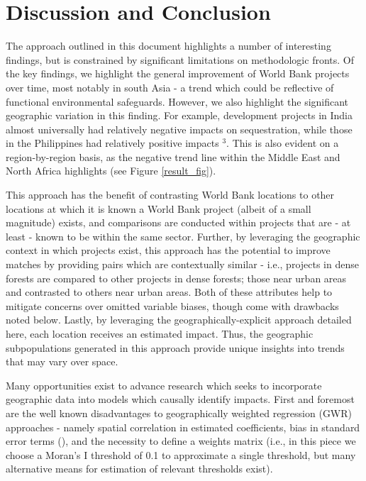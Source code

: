 \documentclass[sustainability,article,submit,moreauthors,pdftex,10pt,a4paper]{mdpi}
\begin{document}
\section{Discussion and Conclusion}
The approach outlined in this document highlights a number of interesting findings, but is constrained by significant limitations on methodologic fronts. Of the key findings, we highlight the general improvement of World Bank projects over time, most notably in south Asia - a trend which could be reflective of functional environmental safeguards. However, we also highlight the significant geographic variation in this finding.  For example, development projects in India almost universally had relatively negative impacts on sequestration, while those in the Philippines had relatively positive impacts \begin{math}^{3}\end{math}. This is also evident on a region-by-region basis, as the negative trend line within the Middle East and North Africa highlights (see Figure \ref{result_fig}).  
\par
This approach has the benefit of contrasting World Bank locations to other locations at which it is known a World Bank project (albeit of a small magnitude) exists, and comparisons are conducted within projects that are - at least - known to be within the same sector. Further, by leveraging the geographic context in which projects exist, this approach has the potential to improve matches by providing pairs which are contextually similar - i.e., projects in dense forests are compared to other projects in dense forests; those near urban areas and contrasted to others near urban areas. Both of these attributes help to mitigate concerns over omitted variable biases, though come with drawbacks noted below. Lastly, by leveraging the geographically-explicit approach detailed here, each location receives an estimated impact. Thus, the geographic subpopulations generated in this approach provide unique insights into trends that may vary over space.
\par
Many opportunities exist to advance research which seeks to incorporate geographic data into models which causally identify impacts. First and foremost are the well known disadvantages to geographically weighted regression (GWR) approaches - namely spatial correlation in estimated coefficients, bias in standard error terms (\cite{wheeler_multicollinearity_2005}), and the necessity to define a weights matrix (i.e., in this piece we choose a Moran's I threshold of 0.1 to approximate a single threshold, but many alternative means for estimation of relevant thresholds exist).  
\end{document}
